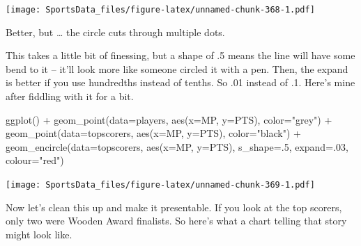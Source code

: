\documentclass[
]{book}
\newenvironment{Shaded}{\begin{snugshade}}{\end{snugshade}}
\newcommand{\AttributeTok}[1]{\textcolor[rgb]{0.77,0.63,0.00}{#1}}
\newcommand{\DecValTok}[1]{\textcolor[rgb]{0.00,0.00,0.81}{#1}}
\newcommand{\FunctionTok}[1]{\textcolor[rgb]{0.00,0.00,0.00}{#1}}
\newcommand{\NormalTok}[1]{#1}
\newcommand{\SpecialCharTok}[1]{\textcolor[rgb]{0.00,0.00,0.00}{#1}}
\newcommand{\StringTok}[1]{\textcolor[rgb]{0.31,0.60,0.02}{#1}}
\begin{document}
\texttt{[image: SportsData\_files/figure-latex/unnamed-chunk-368-1.pdf]}

Better, but \ldots{} the circle cuts through multiple dots.

This takes a little bit of finessing, but a shape of .5 means the line will have some bend to it -- it'll look more like someone circled it with a pen. Then, the expand is better if you use hundredths instead of tenths. So .01 instead of .1. Here's mine after fiddling with it for a bit.

\begin{Shaded}
\begin{Highlighting}[]
\FunctionTok{ggplot}\NormalTok{() }\SpecialCharTok{+} 
  \FunctionTok{geom\_point}\NormalTok{(}\AttributeTok{data=}\NormalTok{players, }\FunctionTok{aes}\NormalTok{(}\AttributeTok{x=}\NormalTok{MP, }\AttributeTok{y=}\NormalTok{PTS), }\AttributeTok{color=}\StringTok{"grey"}\NormalTok{) }\SpecialCharTok{+} 
  \FunctionTok{geom\_point}\NormalTok{(}\AttributeTok{data=}\NormalTok{topscorers, }\FunctionTok{aes}\NormalTok{(}\AttributeTok{x=}\NormalTok{MP, }\AttributeTok{y=}\NormalTok{PTS), }\AttributeTok{color=}\StringTok{"black"}\NormalTok{) }\SpecialCharTok{+} 
  \FunctionTok{geom\_encircle}\NormalTok{(}\AttributeTok{data=}\NormalTok{topscorers, }\FunctionTok{aes}\NormalTok{(}\AttributeTok{x=}\NormalTok{MP, }\AttributeTok{y=}\NormalTok{PTS), }\AttributeTok{s\_shape=}\NormalTok{.}\DecValTok{5}\NormalTok{, }\AttributeTok{expand=}\NormalTok{.}\DecValTok{03}\NormalTok{, }\AttributeTok{colour=}\StringTok{"red"}\NormalTok{)}
\end{Highlighting}
\end{Shaded}

\texttt{[image: SportsData\_files/figure-latex/unnamed-chunk-369-1.pdf]}

Now let's clean this up and make it presentable. If you look at the top scorers, only two were Wooden Award finalists. So here's what a chart telling that story might look like.
\end{document}
